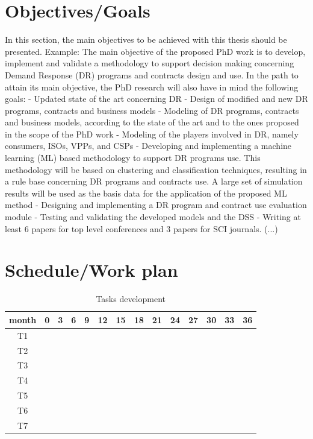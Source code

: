 \documentclass[12pt]{article}
\begin{document}
\section{Objectives/Goals}
In this section, the main objectives to be achieved with this thesis should be presented. Example:
The main objective of the proposed PhD work is to develop, implement and validate a methodology to support decision making concerning Demand Response (DR) programs and contracts design and use. 
In the path to attain its main objective, the PhD research will also have in mind the following goals:
- Updated state of the art concerning DR
- Design of modified and new DR programs, contracts and business models
- Modeling of DR programs, contracts and business models, according to the state of the art and to the ones proposed in the scope of the PhD work
- Modeling of the players involved in DR, namely consumers, ISOs, VPPs, and CSPs
- Developing and implementing a machine learning (ML) based methodology to support DR programs use. This methodology will be based on clustering and classification techniques, resulting in a rule base concerning DR programs and contracts use. A large set of simulation results will be used as the basis data for the application of the proposed ML method
- Designing and implementing a DR program and contract use evaluation module
- Testing and validating the developed models and the DSS
- Writing at least 6 papers for top level conferences and 3 papers for SCI journals.
(...)


\section{Schedule/Work plan}

\begin{table}
\centering
\caption {Tasks development}
\label{tab:340W}
\begin{tabular}{| c | c | c | c |c | c | c |c | c | c |c | c | c |c | }
\hline 
  month & 0 & 3 & 6 & 9 & 12 & 15 & 18 & 21 & 24 & 27 & 30 & 33 & 36 \\
\hline 
T1  & \cellcolor{gray} & \cellcolor{gray} & \cellcolor{gray} &   &   &   &   &   &   &   &   &   &   \\
\hline
T2  &  &  &  & \cellcolor{gray} & \cellcolor{gray}  & \cellcolor{gray} &   &    &  &  &  &  &  \\
\hline
T3  &  &  &  &  & \cellcolor{gray} & \cellcolor{gray}  & \cellcolor{gray} &  \cellcolor{gray} & \cellcolor{gray}  &  &  &  & \\
\hline
T4  &  &  &  &  &  &  &  &   &   &   &   &   & \\
\hline
T5  &  &  &  &  &  &  &  &   &  &  &  &  & \\
\hline
T6  &  &  &  &  &  &  &  &   &  &  &  &  & \\
\hline
T7  &   &  &  &  &  &  &  &   &  &  &  &  & \\
\hline
\end{tabular}
\end{table}
\end{document}
